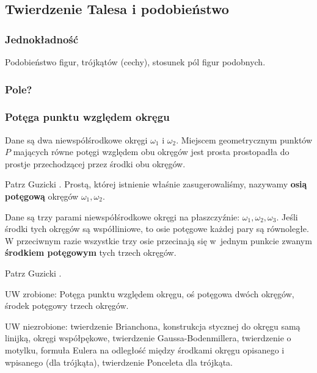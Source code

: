 %

\subsection{Twierdzenie Talesa i podobieństwo}
\subsubsection{Jednokładność}
Podobieństwo figur, trójkątów (cechy), stosunek pól figur podobnych.



\subsubsection{Pole?}




\subsubsection{Potęga punktu względem okręgu}

\begin{proposition}
\label{guzicki_6_11}%
    Dane są dwa niewspółśrodkowe okręgi $\omega_1$ i $\omega_2$.
    Miejscem geometrycznym punktów $P$ mających równe potęgi względem obu okręgów jest prosta prostopadła do prostje przechodzącej przez środki obu okręgów.
%
\end{proposition}

Patrz Guzicki \cite[s. 173, 174]{guzicki_2021}.
Prostą, której istnienie właśnie zasugerowaliśmy, nazywamy \textbf{osią potęgową} okręgów $\omega_1, \omega_2$.

\begin{corollary}
	Dane są trzy parami niewspółśrodkowe okręgi na płaszczyźnie: $\omega_1, \omega_2, \omega_3$.
	Jeśli środki tych okręgów są współliniowe, to osie potęgowe każdej pary są równoległe.
	W przeciwnym razie wszystkie trzy osie przecinają się w~jednym punkcie zwanym \textbf{środkiem potęgowym} tych trzech okręgów.
\end{corollary}

Patrz Guzicki \cite[s. 174]{guzicki_2021}.


UW zrobione:
Potęga punktu względem okręgu, oś potęgowa dwóch okręgów, środek potęgowy trzech okręgów.

UW niezrobione:
twierdzenie Brianchona, konstrukcja stycznej do okręgu samą linijką, okręgi współpękowe, twierdzenie Gaussa-Bodenmillera, twierdzenie o motylku, formuła Eulera na odległość między środkami okręgu opisanego i wpisanego (dla trójkąta), twierdzenie Ponceleta dla trójkąta.

